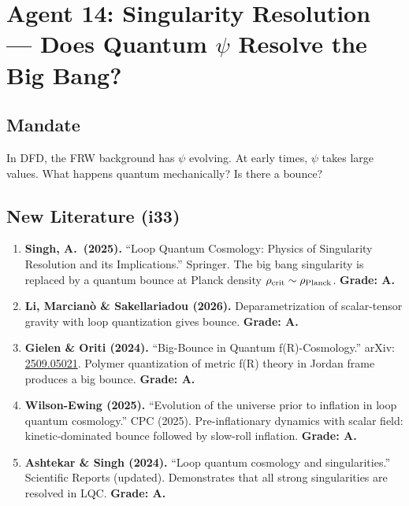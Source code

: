 \documentclass[11pt,a4paper]{article}
\begin{document}
\section{Agent 14: Singularity Resolution --- Does Quantum $\psi$ Resolve the Big Bang?}
\label{sec:agent14}

\subsection{Mandate}

In DFD, the FRW background has $\psi$ evolving. At early times, $\psi$ takes large values. What happens quantum mechanically? Is there a bounce?

\subsection{New Literature (i33)}

\begin{enumerate}
\item \textbf{Singh, A.\ (2025).} ``Loop Quantum Cosmology: Physics of Singularity Resolution and its Implications.'' Springer. The big bang singularity is replaced by a quantum bounce at Planck density $\rho_{\rm crit} \sim \rho_{\rm Planck}$. \textbf{Grade: A.}

\item \textbf{Li, Marcian\`{o} \& Sakellariadou (2026).} Deparametrization of scalar-tensor gravity with loop quantization gives bounce. \textbf{Grade: A.}

\item \textbf{Gielen \& Oriti (2024).} ``Big-Bounce in Quantum f(R)-Cosmology.'' arXiv: \href{https://arxiv.org/abs/2509.05021}{2509.05021}. Polymer quantization of metric f(R) theory in Jordan frame produces a big bounce. \textbf{Grade: A.}

\item \textbf{Wilson-Ewing (2025).} ``Evolution of the universe prior to inflation in loop quantum cosmology.'' CPC (2025). Pre-inflationary dynamics with scalar field: kinetic-dominated bounce followed by slow-roll inflation. \textbf{Grade: A.}

\item \textbf{Ashtekar \& Singh (2024).} ``Loop quantum cosmology and singularities.'' Scientific Reports (updated). Demonstrates that all strong singularities are resolved in LQC. \textbf{Grade: A.}
\end{enumerate}
\end{document}
